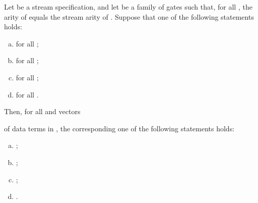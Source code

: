 \begin{lemma}
  \label{lem2:outsourcing}
Let  be a stream specification, and let\/
   be a family of gates
  such that, for all\/ , the arity of\/ 
  equals the stream arity of\/ .
Suppose that one of the following statements holds:
\begin{enumerate}[(a)]
\item  for all\/ ;\label{lem2:outsourcing:item:1}\vspace{0.5ex}
\item  for all\/ ;\label{lem2:outsourcing:item:2}\vspace{0.5ex}
\item  for all\/ ;\label{lem2:outsourcing:item:3}\vspace{0.5ex} 
\item  for all\/ .\label{lem2:outsourcing:item:4}\vspace{0.5ex}
\end{enumerate}
Then, for all 
  and vectors 
   
  of data terms in ,
  the corresponding one of the following statements holds:
\begin{enumerate}[(a)]
\item ;\vspace{0.5ex}
\item ;\vspace{0.5ex}
\item ;\vspace{0.5ex}
\item .
\end{enumerate}
\end{lemma}



